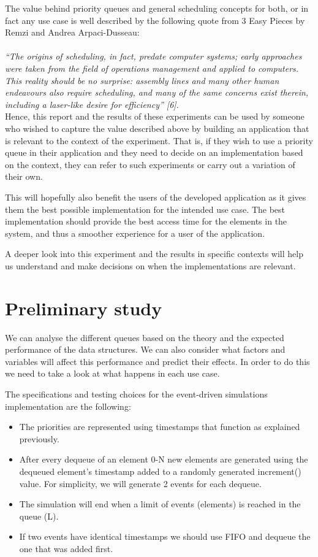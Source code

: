 \documentclass[12pt]{article}
\begin{document}
The value behind priority queues and general scheduling concepts for both, or in fact any use case is well described by the following quote from 3 Easy Pieces by Remzi and Andrea Arpaci-Dusseau:
\\
\\
 \textit{“The origins of scheduling, in fact, predate computer systems; early approaches were taken from the field of operations management and applied to computers. This reality should be no surprise: assembly lines and many other human endeavours also require scheduling, and many of the same concerns exist therein, including a laser-like desire for efficiency” [6].} \\

Hence, this report and the results of these experiments can be used by someone who wished to capture the value described above by building an application that is relevant to the context of the experiment. That is, if they wish to use a priority queue in their application and they need to decide on an implementation based on the context, they can refer to such experiments or carry out a variation of their own. 

This will hopefully also benefit the users of the developed application as it gives them the best possible implementation for the intended use case. The best implementation should provide the best access time for the elements in the system, and thus a smoother experience for a user of the application.

 A deeper look into this experiment and the results in specific contexts will help us understand and make decisions on when the implementations are relevant. 

\section{Preliminary study}

We can analyse the different queues based on the theory and the expected performance of the data structures. We can also consider what factors and variables will affect this performance and predict their effects. In order to do this we need to take a look at what happens in each use case. 

 The specifications and testing choices for the event-driven simulations implementation are the following: 

\begin{itemize}
   \item The priorities are represented using timestamps that function as explained previously. 
   \item After every dequeue of an element 0-N new elements are generated using the dequeued element’s timestamp added to a randomly generated increment() value. For simplicity, we will generate 2 events for each dequeue. 
   \item The simulation will end when a limit of events (elements) is reached in the queue (L).
   \item If two events have identical timestamps we should use FIFO and dequeue the one that was added first. 
\end{itemize}
\end{document}
